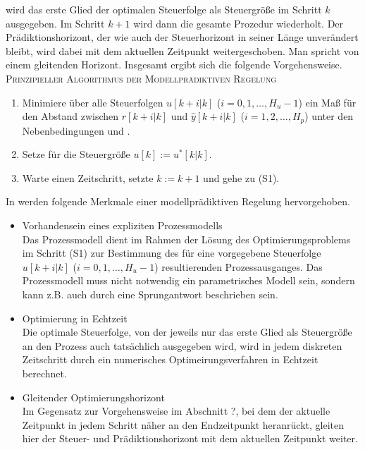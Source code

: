 wird das erste Glied der optimalen Steuerfolge als Steuergröße im Schritt $k$ ausgegeben. Im Schritt $k+1$ wird dann die gesamte Prozedur wiederholt. Der Prädiktionshorizont, der wie
auch der Steuerhorizont in seiner Länge unverändert bleibt, wird dabei mit dem aktuellen Zeitpunkt weitergeschoben. Man spricht von einem gleitenden
Horizont. Insgesamt ergibt sich die folgende Vorgehensweise.\\
\textsc{Prinzipieller Algorithmus der Modellprädiktiven Regelung}
\begin{enumerate}[label=(S\arabic*)]
  \item Minimiere über alle Steuerfolgen $u[k+i|k]$ ($i=0,1,\ldots,H_u-1$) ein Maß für den Abstand zwischen $r[k+i|k]$ und $\hat{y}[k+i|k]$ ($i=1,2,\ldots,H_p$) unter den
  Nebenbedingungen  und .
  \item Setze für die Steuergröße $u[k]:=u^{\ast}[k|k]$.
  \item Warte einen Zeitschritt, setzte $k:=k+1$ und gehe zu (S1).
\end{enumerate}
In \cite{Maciejowski2002} werden folgende Merkmale einer modellprädiktiven Regelung hervorgehoben.
\begin{itemize}
  \item Vorhandensein eines expliziten Prozessmodells\\
  		Das Prozessmodell dient im Rahmen der Lösung des Optimierungsproblems im Schritt (S1) zur Bestimmung des für eine vorgegebene Steuerfolge $u[k+i|k]$ ($i=0,1,\ldots,H_u-1$)
  		resultierenden Prozessausganges. Das Prozessmodell muss nicht notwendig ein parametrisches Modell sein, sondern kann z.B. auch durch eine
  		Sprungantwort beschrieben sein.
  \item Optimierung in Echtzeit\\
  		Die optimale Steuerfolge, von der jeweils nur das erste Glied als Steuergröße an den Prozess auch tatsächlich ausgegeben wird, wird in jedem diskreten Zeitschritt durch ein
  		numerisches Optimeirungsverfahren in Echtzeit berechnet.
  \item Gleitender Optimierungshorizont\\
  		Im Gegensatz zur Vorgehensweise im Abschnitt ?, bei dem der aktuelle Zeitpunkt in jedem Schritt näher an den Endzeitpunkt heranrückt, gleiten hier der Steuer- und
  		Prädiktionshorizont mit dem aktuellen Zeitpunkt weiter. 
\end{itemize}

